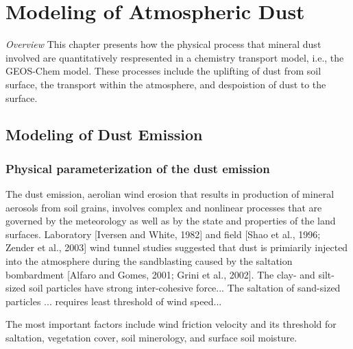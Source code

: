 \chapter{Modeling of Atmospheric Dust}

 \hspace{0.5cm} \textit{Overview} \hspace{0.2cm} 
 This chapter presents how the physical process that mineral dust 
 involved are quantitatively respresented in a chemistry transport model, i.e., 
 the GEOS-Chem model. These processes include the uplifting of dust from soil surface, 
 the transport within the atmosphere, and despoistion of dust to the surface. 

\section{Modeling of Dust Emission}

\subsection{Physical parameterization of the dust emission}

  The dust emission, aerolian wind erosion that results in production of mineral aerosols
  from soil grains, involves complex and nonlinear processes that are governed by the 
  meteorology as well as by the state and properties of the land surfaces. Laboratory 
  [Iversen and White, 1982] and field [Shao et al., 1996; Zender et al., 2003] wind tunnel
  studies suggested that dust is primiarily injected into the atmosphere during the 
  sandblasting caused by the saltation bombardment [Alfaro and Gomes, 2001; Grini et al.,
  2002]. The clay- and silt-sized soil particles have strong inter-cohesive force... 
  The saltation of sand-sized particles ... requires least threshold of wind speed...


  The most important factors include wind friction velocity and its threshold for 
  saltation, vegetation cover, soil minerology, and surface soil moisture. 

